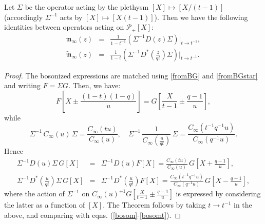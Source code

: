 \begin{thm}\label{BGconnect}
Let $\Sigma$ be the operator acting by the plethysm $[X]\mapsto [X/(t-1)]$ 
(accordingly $\Sigma^{-1}$ acts by $[X]\mapsto [X(t-1)]$). 
Then we have the following identities between operators acting on ${\mathcal P}_+[X]$:
\begin{eqnarray*} 
{\mathfrak m}_\infty(z)&=& \frac{1}{1-t^{-1}} \left(\Sigma^{-1} D(z) \Sigma\right)\Big\vert_{t\to t^{-1}}, \\
\widetilde{\mathfrak m}_\infty(z)&=& \frac{1}{1-t} \left(\Sigma^{-1} D^*\left(\frac{z}{q t}\right) \Sigma\right)\Big\vert_{t\to t^{-1}} .
\end{eqnarray*}
\end{thm}
\begin{proof}
The bosonized expressions are matched using \eqref{fromBG} and \eqref{fromBGstar} and 
writing  $F=\Sigma G$. Then, we have:
$$F\left[X\pm \frac{(1-t)(1-q)}{u}\right] =G\left[\frac{X}{t-1}\pm \frac{q-1}{u}\right],$$
while
$$\Sigma^{-1} \, C_\infty(u)\, \Sigma=\frac{C_{\infty}(t u)}{C_{\infty}(u)}, \quad 
\Sigma^{-1} \, \frac{1}{C_\infty(\frac{u}{q t})}\, \Sigma=\frac{C_{\infty}(t^{-1}q^{-1}u)}{C_{\infty}(q^{-1} u)} .$$
Hence 
\begin{eqnarray*}
\Sigma^{-1}D(u)\Sigma \,G[X]&=&\Sigma^{-1}D(u)F[X]= \frac{C_{\infty}(t u)}{C_{\infty}(u)} \, G\left[X + \frac{q-1}{u}\right],\\
\Sigma^{-1}D^*(\frac{u}{q t})\Sigma \,G[X]&=&\Sigma^{-1}D^*(\frac{u}{q t})F[X]=\frac{C_{\infty}(t^{-1}q^{-1}u)}{C_{\infty}(q^{-1}u)}  \, G\left[X - \frac{q-1}{u}\right],
\end{eqnarray*}
where the action of $\Sigma^{-1}$ on $C_\infty(u)^{\pm 1}G\left[\frac{X}{t-1}\pm \frac{q-1}{u}\right]$ is expressed
by considering the latter as a function of $[X]$.
The Theorem follows by taking $t\to t^{-1}$ in the above, and comparing with eqns. (\ref{bosom}-\ref{bosomt}).
\end{proof}


